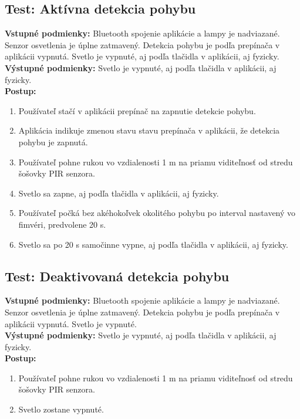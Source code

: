 \documentclass[12pt, a4paper]{article}
\begin{document}
\subsection{Test: Aktívna detekcia pohybu}
\noindent\textbf{Vstupné podmienky:} Bluetooth spojenie aplikácie a lampy je nadviazané. Senzor osvetlenia je úplne zatmavený. Detekcia pohybu je podľa prepínača v aplikácii vypnutá. Svetlo je vypnuté, aj podľa tlačidla v aplikácii, aj fyzicky. \\
\textbf{Výstupné podmienky:} Svetlo je vypnuté, aj podľa tlačidla v aplikácii, aj fyzicky. \\
\textbf{Postup:}
\begin{enumerate}
\itemsep0pt
\item Používateľ stačí v aplikácii prepínač na zapnutie detekcie pohybu.
\item Aplikácia indikuje zmenou stavu stavu prepínača v aplikácii, že detekcia pohybu je zapnutá.
\item Používateľ pohne rukou vo vzdialenosti 1 m na priamu viditeľnosť od stredu šošovky PIR senzora.
\item Svetlo sa zapne, aj podľa tlačidla v aplikácii, aj fyzicky.
\item Používateľ počká bez akéhokoľvek okolitého pohybu po interval nastavený vo fimvéri, predvolene 20 s.
\item Svetlo sa po 20 s samočinne vypne, aj podľa tlačidla v aplikácii, aj fyzicky.
\end{enumerate}

\subsection{Test: Deaktivovaná detekcia pohybu}
\noindent\textbf{Vstupné podmienky:} Bluetooth spojenie aplikácie a lampy je nadviazané. Senzor osvetlenia je úplne zatmavený. Detekcia pohybu je podľa prepínača v aplikácii vypnutá. Svetlo je vypnuté. \\
\textbf{Výstupné podmienky:} Svetlo je vypnuté, aj podľa tlačidla v aplikácii, aj fyzicky. \\
\textbf{Postup:}
\begin{enumerate}
\itemsep0pt
\item Používateľ pohne rukou vo vzdialenosti 1 m na priamu viditeľnosť od stredu šošovky PIR senzora.
\item Svetlo zostane vypnuté.
\end{enumerate}
\end{document}

